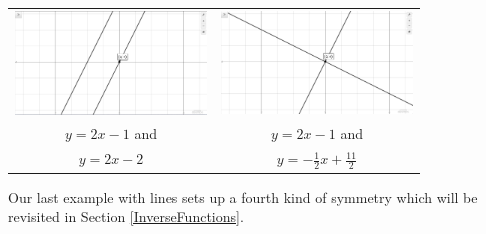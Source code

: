\begin{ex}
\begin{enumerate}
\begin{center}

\begin{tabular}{cc}

\includegraphics[width=2in]{./AppLinesGraphics/A5Graph01.jpg} &

\hspace{0.75in} \includegraphics[width=2in]{./AppLinesGraphics/A5Graph02.jpg} \\

$y = 2x-1$ and  & 

 \hspace{0.75in}  $y = 2x-1$ and  \\
 
 \boldmath $y=2x-2$ & \hspace{0.75in} \boldmath $y= -\frac{1}{2} x + \frac{11}{2} $\\
 
\end{tabular}

\end{center}



\end{enumerate}


\end{ex}


\label{inversemidpoint}

Our last example with lines sets up a fourth kind of symmetry which will be revisited in Section \ref{InverseFunctions}.  

